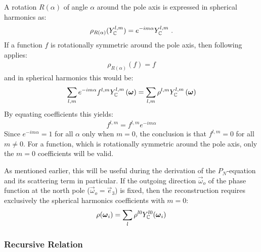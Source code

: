 A rotation $R(\alpha)$ of angle $\alpha$ around the pole axis is expressed in spherical harmonics as:
\begin{align*}
\rho_{R(\alpha)}(Y_{\mathbb{C}}^{l,m}) = e^{-i m\alpha}Y_{\mathbb{C}}^{l,m}
\ .
\end{align*}
If a function $f$ is rotationally symmetric around the pole axis, then following applies:
\begin{align*}
\rho_{R(\alpha)}(f) = f
\end{align*}
and in spherical harmonics this would be:
\begin{align*}
\sum_{l,m}
{
e^{-i m\alpha}
f^{l,m}
Y_{\mathbb{C}}^{l,m} }\left(\boldsymbol{\mathbf{\omega}}\right)
=
\sum_{l,m}
{
\rho^{l,m}
Y_{\mathbb{C}}^{l,m}\left(\boldsymbol{\mathbf{\omega}}\right)
}
\end{align*}
By equating coefficients this yields:
\begin{align*}
f^{l,m} = f^{l,m}e^{-i m\alpha}
\end{align*}
Since $e^{-i m\alpha}=1$ for all $\alpha$ only when $m=0$, the conclusion is that $f^{l,m} = 0$ for all $m\ne0$. For a function, which is rotationally symmetric around the pole axis, only the $m=0$ coefficients will be valid.

As mentioned earlier, this will be useful during the derivation of the $P_N$-equation and its scattering term in particular. If the outgoing direction $\vec{\omega}_o$ of the phase function at the north pole ($\vec{\omega}_o=\vec{e}_3$) is fixed, then the reconstruction requires exclusively the spherical harmonics coefficients with $m=0$:
\begin{align}
\label{eq:sh_exp_phase}
\rho(\boldsymbol{\mathbf{\omega}}_i) =
\sum_l
{
\rho^{l0}
Y_{\mathbb{C}}^{l0}(\boldsymbol{\mathbf{\omega}}_i)
}
\end{align}

\subsubsection*{Recursive Relation}

